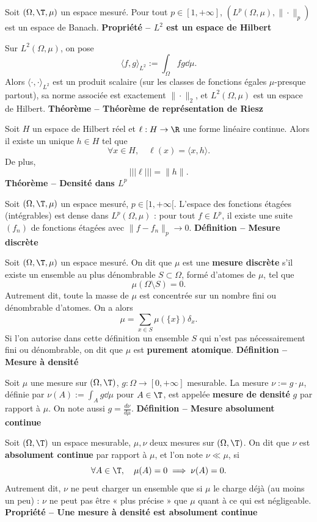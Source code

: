Soit $(\Omega,\T,\mu)$ un espace mesuré. Pour tout $p\in[1,+\infty]$, $(L^p(\Omega,\mu),\|\cdot\|_p)$ est un espace de Banach.
\textbf{Propriété – $L^2$ est un espace de Hilbert}

Sur $L^2(\Omega,\mu)$, on pose
\[\langle f,g\rangle_{L^2}:=\int_\Omega fg\dd\mu.\]
Alors $\langle\cdot,\cdot\rangle_{L^2}$ est un produit scalaire (sur les classes de fonctions égales $\mu$-presque partout), sa norme associée est exactement $\|\cdot\|_2$, et $L^2(\Omega,\mu)$ est un espace de Hilbert.
\textbf{Théorème – Théorème de représentation de Riesz}

Soit $H$ un espace de Hilbert réel et $\ell:H\to\R$ une forme linéaire continue. Alors il existe un unique $h\in H$ tel que
\[\forall x\in H,\quad\ell(x)=\langle x,h\rangle.\]
De plus,
\[\lvert\!\lvert\!\lvert\ell\rvert\!\rvert\!\rvert=\|h\|.\]
\textbf{Théorème – Densité dans $L^p$}

Soit $(\Omega,\T,\mu)$ un espace mesuré, $p\in[1,+\infty[$. L’espace des fonctions étagées (intégrables) est dense dans $L^p(\Omega,\mu)$ : pour tout $f\in L^p$, il existe une suite $(f_n)$ de fonctions étagées avec $\|f-f_n\|_p\to0$.
\textbf{Définition – Mesure discrète}

Soit $(\Omega,\T,\mu)$ un espace mesuré. On dit que $\mu$ est une \textbf{mesure discrète} s’il existe un ensemble au plus dénombrable $S\subset\Omega$, formé d’atomes de $\mu$, tel que
\[\mu(\Omega\setminus S)=0.\]
Autrement dit, toute la masse de $\mu$ est concentrée sur un nombre fini ou dénombrable d’atomes. On a alors
\[\mu=\sum_{x\in S}\mu(\{x\})\delta_x.\]
Si l’on autorise dans cette définition un ensemble $S$ qui n’est pas nécessairement fini ou dénombrable, on dit que $\mu$ est \textbf{purement atomique}.
\textbf{Définition – Mesure à densité}

Soit $\mu$ une mesure sur $(\Omega,\T)$, $g:\Omega\to[0,+\infty]$ mesurable. La mesure $\nu:=g\cdot\mu$, définie par $\nu(A):=\int_A g\dd\mu$ pour $A\in\T$, est appelée \textbf{mesure de densité} $g$ par rapport à $\mu$. On note aussi $g=\frac{d\nu}{d\mu}$.
\textbf{Définition – Mesure absolument continue}

Soit $(\Omega,\T)$ un espace mesurable, $\mu,\nu$ deux mesures sur $(\Omega,\T)$. On dit que $\nu$ est \textbf{absolument continue} par rapport à $\mu$, et l’on note $\nu\ll\mu$, si
\[\forall A\in\T,\quad\mu(A)=0\implies\nu(A)=0.\]
Autrement dit, $\nu$ ne peut charger un ensemble que si $\mu$ le charge déjà (au moins un peu) : $\nu$ ne peut pas être « plus précise » que $\mu$ quant à ce qui est négligeable.
\textbf{Propriété – Une mesure à densité est absolument continue}


